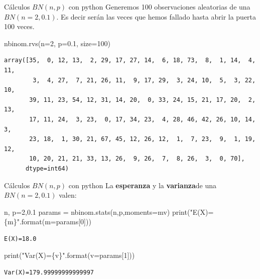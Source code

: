 \documentclass[
  ignorenonframetext,
  aspectratio=169]{beamer}
\newenvironment{Shaded}{\begin{snugshade}}{\end{snugshade}}
\newcommand{\BuiltInTok}[1]{\textcolor[rgb]{0.00,0.23,0.31}{#1}}
\newcommand{\DecValTok}[1]{\textcolor[rgb]{0.68,0.00,0.00}{#1}}
\newcommand{\FloatTok}[1]{\textcolor[rgb]{0.68,0.00,0.00}{#1}}
\newcommand{\NormalTok}[1]{\textcolor[rgb]{0.00,0.23,0.31}{#1}}
\newcommand{\OperatorTok}[1]{\textcolor[rgb]{0.37,0.37,0.37}{#1}}
\newcommand{\SpecialCharTok}[1]{\textcolor[rgb]{0.37,0.37,0.37}{#1}}
\newcommand{\StringTok}[1]{\textcolor[rgb]{0.13,0.47,0.30}{#1}}
\begin{document}
\begin{frame}[fragile]{Cálculos \(BN(n,p)\) con python}
\protect\hypertarget{cuxe1lculos-bnnp-con-python-1}{}
Generemos 100 observaciones aleatorias de una \(BN(n=2,0.1)\). Es decir
serán las veces que hemos fallado hasta abrir la puerta 100 veces.

\begin{Shaded}
\begin{Highlighting}[]
\NormalTok{nbinom.rvs(n}\OperatorTok{=}\DecValTok{2}\NormalTok{, p}\OperatorTok{=}\FloatTok{0.1}\NormalTok{, size}\OperatorTok{=}\DecValTok{100}\NormalTok{)}
\end{Highlighting}
\end{Shaded}

\begin{verbatim}
array([35,  0, 12, 13,  2, 29, 17, 27, 14,  6, 18, 73,  8,  1, 14,  4, 11,
        3,  4, 27,  7, 21, 26, 11,  9, 17, 29,  3, 24, 10,  5,  3, 22, 10,
       39, 11, 23, 54, 12, 31, 14, 20,  0, 33, 24, 15, 21, 17, 20,  2, 13,
       17, 11, 24,  3, 23,  0, 17, 34, 23,  4, 28, 46, 42, 26, 10, 14,  3,
       23, 18,  1, 30, 21, 67, 45, 12, 26, 12,  1,  7, 23,  9,  1, 19, 12,
       10, 20, 21, 21, 33, 13, 26,  9, 26,  7,  8, 26,  3,  0, 70],
      dtype=int64)
\end{verbatim}
\end{frame}

\begin{frame}[fragile]{Cálculos \(BN(n,p)\) con python}
\protect\hypertarget{cuxe1lculos-bnnp-con-python-2}{}
La \textbf{esperanza} y la \textbf{varianza}de una \(BN(n=2,0.1)\)
valen:

\begin{Shaded}
\begin{Highlighting}[]
\NormalTok{n, p}\OperatorTok{=}\DecValTok{2}\NormalTok{,}\FloatTok{0.1}
\NormalTok{params }\OperatorTok{=}\NormalTok{ nbinom.stats(n,p,moments}\OperatorTok{=}\StringTok{\textquotesingle{}mv\textquotesingle{}}\NormalTok{)}
\BuiltInTok{print}\NormalTok{(}\StringTok{"E(X)=}\SpecialCharTok{\{m\}}\StringTok{"}\NormalTok{.}\BuiltInTok{format}\NormalTok{(m}\OperatorTok{=}\NormalTok{params[}\DecValTok{0}\NormalTok{]))}
\end{Highlighting}
\end{Shaded}

\begin{verbatim}
E(X)=18.0
\end{verbatim}

\begin{Shaded}
\begin{Highlighting}[]
\BuiltInTok{print}\NormalTok{(}\StringTok{"Var(X)=}\SpecialCharTok{\{v\}}\StringTok{"}\NormalTok{.}\BuiltInTok{format}\NormalTok{(v}\OperatorTok{=}\NormalTok{params[}\DecValTok{1}\NormalTok{]))}
\end{Highlighting}
\end{Shaded}

\begin{verbatim}
Var(X)=179.99999999999997
\end{verbatim}
\end{frame}
\end{document}
